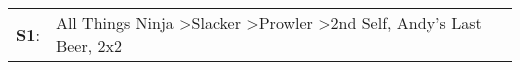 \begin{supertabular}{p{0.03\textwidth}p{0.92\textwidth}}
 \textbf{S1}:  &  All Things Ninja\textsuperscript{} \textgreater \enspace Slacker\textsuperscript{} \textgreater \enspace Prowler\textsuperscript{} \textgreater \enspace 2nd Self\textsuperscript{}, \enspace Andy's Last Beer\textsuperscript{}, \enspace 2x2\textsuperscript{}  \enspace  \\
\end{supertabular}
